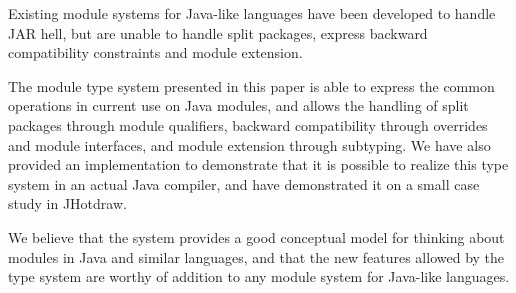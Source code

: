 Existing module systems for Java-like languages have been developed
to handle JAR hell, but are unable to handle split packages,
express backward compatibility constraints and module extension.

The module type system presented in this paper is able to express the common operations
in current use on Java modules, and allows the handling of split packages through
module qualifiers, backward compatibility through overrides and module interfaces,
and module extension through subtyping. We have
also provided an implementation to demonstrate that it is
possible to realize this type system in an actual Java compiler,
and have demonstrated it on a small case study in JHotdraw.

We believe that the system provides a good conceptual
model for thinking about modules in Java and similar languages,
and that the new features allowed by the type system are worthy
of addition to any module system for Java-like languages.